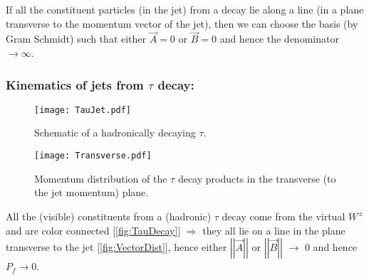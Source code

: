 If all the constituent particles (in the jet) from a decay lie along a line (in a plane transverse to the momentum vector of the jet), then we can choose the basis (by Gram Schmidt) such that either $\vec{A}=0$ or $\vec{B}=0$ and hence the denominator $\rightarrow\infty$.

\subsubsection{Kinematics of jets from $\tau$ decay:}

\begin{figure}[H]
	\begin{center}
		\texttt{[image: TauJet.pdf]}
		\caption{Schematic of a hadronically decaying $\tau$.}
		\label{fig:TauDecay}
	\end{center}
\end{figure}

\begin{figure}[H]
	\begin{center}
		\texttt{[image: Transverse.pdf]}
		\caption{Momentum distribution of the $\tau$ decay products in the transverse (to the jet momentum) plane.}
		\label{fig:VectorDist}
	\end{center}
\end{figure}

All the (visible) constituents from a (hadronic) $\tau$ decay come from the virtual $W^{\pm}$ and are color connected [\autoref{fig:TauDecay}] $\Rightarrow$ they all lie on a line in the plane transverse to the jet [\autoref{fig:VectorDist}], hence either $\left| \left| \vec{A}  \right|  \right|$ or $\left| \left| \vec{B}  \right|  \right|$ $\rightarrow$ 0 and hence $P_f \rightarrow 0$.
